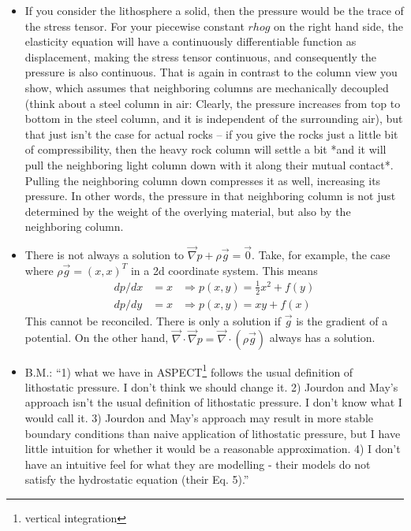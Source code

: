 \begin{itemize}
\item If you consider the lithosphere a solid, then the pressure would be the trace of the stress tensor. 
For your piecewise constant $rho g$ on the right hand side, the elasticity equation will have a 
continuously differentiable function as displacement, making the stress tensor continuous, 
and consequently the pressure is also continuous. That is again in contrast to the column view you show, 
which assumes that neighboring columns are mechanically decoupled (think about a steel column in air: 
Clearly, the pressure increases from top to bottom in the steel column, and it is independent of the surrounding air), 
but that just isn't the case for actual rocks -- if you give the rocks just a little bit of compressibility, 
then the heavy rock column will settle a bit *and it will pull the neighboring light column down with it 
along their mutual contact*. Pulling the neighboring column down compresses it as well, 
increasing its pressure. In other words, the pressure in that neighboring column is not just determined 
by the weight of the overlying material, but also by the neighboring column.

\item There is not always a solution to $\vec\nabla p + \rho \vec{g} = \vec{0}$. 
Take, for example, the case where
$\rho \vec{g} = (x,x)^T$ in a 2d coordinate system. This means
\begin{align}
  dp/dx  &= x  &\Rightarrow   p(x,y) = \frac12 x^2 + f(y) \\
  dp/dy  &= x  &\Rightarrow   p(x,y) = xy + f(x) 
\end{align}
This cannot be reconciled. There is only a solution if $\vec{g}$ is the gradient of a potential.
On the other hand, $\vec\nabla\cdot \vec\nabla  p = \vec\nabla \cdot (\rho \vec{g})$ always has a solution. 

\item B.M.: ``1) what we have in ASPECT\footnote{vertical integration} follows the usual definition of 
lithostatic pressure. I don't think we should change it.
2) Jourdon and May's approach isn't the usual definition of lithostatic pressure. I don't know what I would call it.
3) Jourdon and May's approach may result in more stable boundary conditions than naive application of lithostatic 
pressure, but I have little intuition for whether it would be a reasonable approximation.
4) I don't have an intuitive feel for what they are modelling - their models do not satisfy the hydrostatic equation (their Eq. 5).''
\end{itemize}

